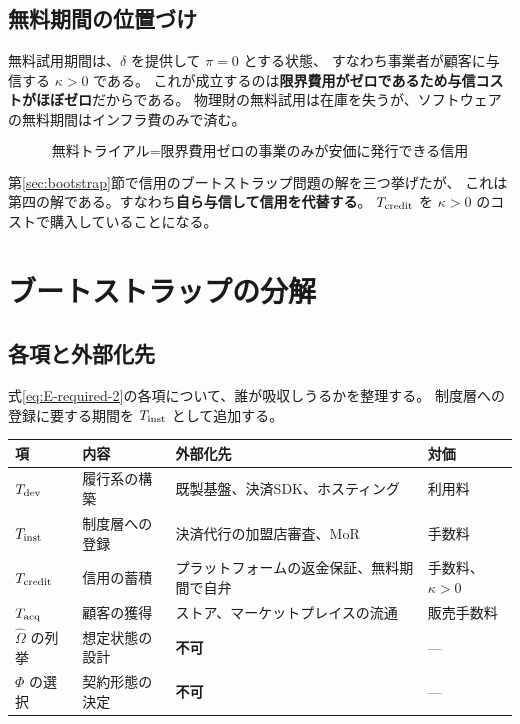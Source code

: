 \subsection{無料期間の位置づけ}

無料試用期間は、$\delta$ を提供して $\pi=0$ とする状態、
すなわち事業者が顧客に与信する $\kappa>0$ である。
これが成立するのは\textbf{限界費用がゼロであるため与信コストがほぼゼロ}だからである。
物理財の無料試用は在庫を失うが、ソフトウェアの無料期間はインフラ費のみで済む。

\begin{equation}
\text{無料トライアル} = \text{限界費用ゼロの事業のみが安価に発行できる信用}
\end{equation}

第\ref{sec:bootstrap}節で信用のブートストラップ問題の解を三つ挙げたが、
これは第四の解である。すなわち\textbf{自ら与信して信用を代替する}。
$T_{\rm credit}$ を $\kappa>0$ のコストで購入していることになる。

\section{ブートストラップの分解}

\subsection{各項と外部化先}

式\eqref{eq:E-required-2}の各項について、誰が吸収しうるかを整理する。
制度層への登録に要する期間を $T_{\rm inst}$ として追加する。

\begin{center}
\begin{tabularx}{\textwidth}{@{}lXXl@{}}
\toprule
項 & 内容 & 外部化先 & 対価 \\
\midrule
$T_{\rm dev}$ & 履行系の構築 & 既製基盤、決済SDK、ホスティング & 利用料 \\
$T_{\rm inst}$ & 制度層への登録 & 決済代行の加盟店審査、MoR & 手数料 \\
$T_{\rm credit}$ & 信用の蓄積 & プラットフォームの返金保証、無料期間で自弁 & 手数料、$\kappa>0$ \\
$T_{\rm acq}$ & 顧客の獲得 & ストア、マーケットプレイスの流通 & 販売手数料 \\
$\hat\Omega$ の列挙 & 想定状態の設計 & \textbf{不可} & --- \\
$\Phi$ の選択 & 契約形態の決定 & \textbf{不可} & --- \\
\bottomrule
\end{tabularx}
\label{tab:bootstrap-outsourcing}
\end{center}

